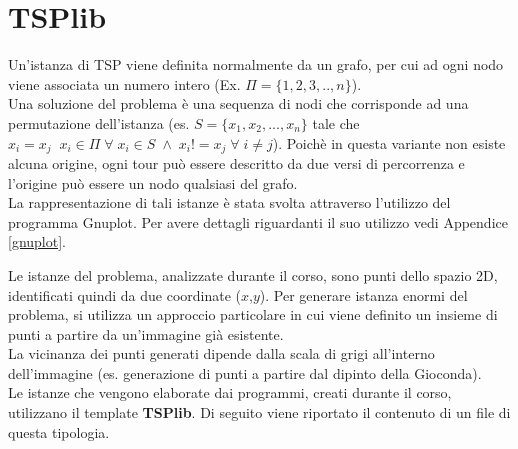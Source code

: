 \chapter{TSPlib}
Un'istanza di TSP viene definita normalmente da un grafo, per cui ad ogni nodo viene associata un numero intero (Ex. $\Pi = \{1,2,3,..,n\}$). \\
Una soluzione del problema è una sequenza di nodi che corrisponde ad una permutazione dell'istanza (es. $S = \{x_1,x_2,...,x_n\}$ tale che $x_i=x_j\;\;x_i \in \Pi\;\forall\;x_i\in S\;\wedge\; x_i!=x_j\;\forall\;i\neq j$). Poichè in questa variante non esiste alcuna origine, ogni tour può essere descritto da due versi di percorrenza e l'origine può essere un nodo qualsiasi del grafo.\\
La rappresentazione di tali istanze è stata svolta attraverso l'utilizzo del programma Gnuplot. Per avere dettagli riguardanti il suo utilizzo vedi Appendice \ref{gnuplot}.

Le istanze del problema, analizzate durante il corso, sono punti dello spazio 2D, identificati quindi da due coordinate ($x$,$y$).
Per generare istanza enormi del problema, si utilizza un approccio particolare in cui viene definito un insieme di punti a partire da un'immagine già esistente.\\
La vicinanza dei punti generati dipende dalla scala di grigi all'interno dell'immagine (es. generazione di punti a partire dal dipinto della Gioconda\cite{monnalisa}).\\
Le istanze che vengono elaborate dai programmi, creati durante il corso, utilizzano il template \textbf{TSPlib}. Di seguito viene riportato il contenuto di un file di questa tipologia.
 


